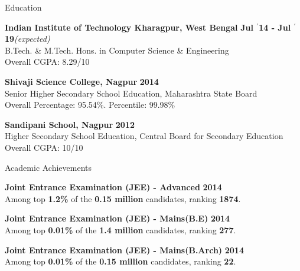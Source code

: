 \documentclass{resume} %
\begin{document}

\begin{rSection}{Education}

{\bf \large Indian Institute of Technology Kharagpur, West Bengal} \hfill \textbf{Jul $^{\prime}$14 - Jul $^{\prime}$19}\textit{(expected)} \\ 
B.Tech. \& M.Tech. Hons. in Computer Science \& Engineering \\
Overall CGPA: 8.29/10

{\bf \large Shivaji Science College, Nagpur} \hfill \textbf{2014} \\ 
Senior Higher Secondary School Education, Maharashtra State Board \\
Overall Percentage: 95.54\%. Percentile: 99.98\%

{\bf \large Sandipani School, Nagpur} \hfill \textbf{2012} \\ 
Higher Secondary School Education, Central Board for Secondary Education \\
Overall CGPA: 10/10

\end{rSection}


\begin{rSection}{Academic Achievements}

{\bf \large Joint Entrance Examination (JEE) - Advanced} \hfill \textbf{2014} \\ 
Among top \textbf{1.2\%} of the \textbf{0.15 million} candidates, ranking \textbf{1874}.

{\bf \large Joint Entrance Examination (JEE) - Mains(B.E)} \hfill \textbf{2014} \\ 
Among top \textbf{0.01\%} of the \textbf{1.4 million} candidates, ranking \textbf{277}.

{\bf \large Joint Entrance Examination (JEE) - Mains(B.Arch)} \hfill \textbf{2014} \\ 
Among top \textbf{0.01\%} of the \textbf{0.15 million} candidates, ranking \textbf{22}.

\end{rSection}
\end{document}
